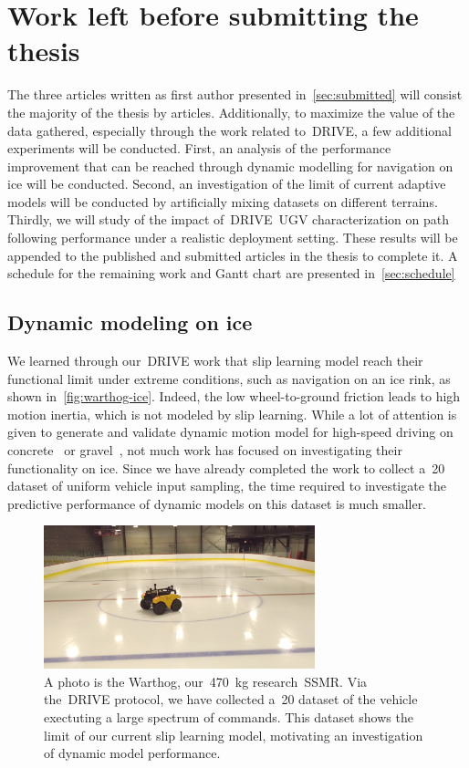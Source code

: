 \section{Work left before submitting the thesis}
\label{sec:future_work}

The three articles written as first author presented in~\autoref{sec:submitted} will consist the majority of the thesis by articles.
Additionally, to maximize the value of the data gathered, especially through the work related to~\ac{DRIVE}, a few additional experiments will be conducted.
First, an analysis of the performance improvement that can be reached through dynamic modelling for navigation on ice will be conducted.
Second, an investigation of the limit of current adaptive models will be conducted by artificially mixing datasets on different terrains.
Thirdly, we will study of the impact of~\ac{DRIVE}~\ac{UGV} characterization on path following performance under a realistic deployment setting.
These results will be appended to the published and submitted articles in the thesis to complete it.
A schedule for the remaining work and Gantt chart are presented in~\autoref{sec:schedule}

\subsection{Dynamic modeling on ice}
We learned through our~\ac{DRIVE} work that slip learning model reach their functional limit under extreme conditions, such as navigation on an ice rink, as shown in~\autoref{fig:warthog-ice}.
Indeed, the low wheel-to-ground friction leads to high motion inertia, which is not modeled by slip learning.
While a lot of attention is given to generate and validate dynamic motion model for high-speed driving on concrete~\citep{Djeumou2023} or gravel~\citep{Williams2018}, not much work has focused on investigating their functionality on ice.
Since we have already completed the work to collect a~\SI{20}{\min} dataset of uniform vehicle input sampling, the time required to investigate the predictive performance of dynamic models on this dataset is much smaller.
\begin{figure}
	\centering
	\includegraphics[width=0.7\textwidth]{figs/warthog_ice.png}
	\caption{
		A photo is the Warthog, our~\SI{470}{\kilo\gram} research~\ac{SSMR}.
		Via the~\ac{DRIVE} protocol, we have collected a~\SI{20}{\min} dataset of the vehicle exectuting a large spectrum of commands.
		This dataset shows the limit of our current slip learning model, motivating an investigation of dynamic model performance.
	}
	\label{fig:warthog-ice}
\end{figure}

